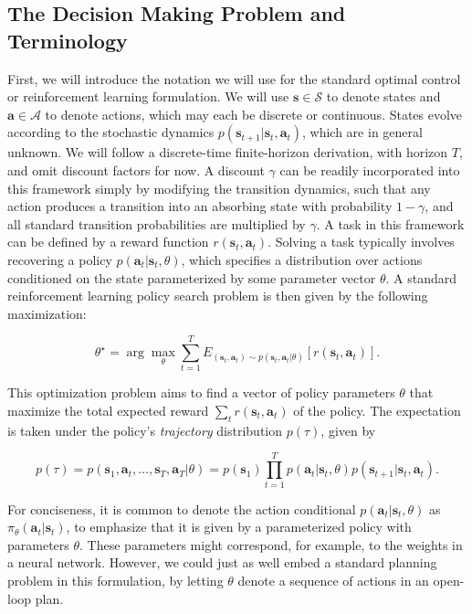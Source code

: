 \subsection{The Decision Making Problem and Terminology}

First, we will introduce the notation we will use for the standard optimal control or reinforcement learning formulation. We will use $\mathbf{s} \in \mathcal{S}$ to denote states and $\mathbf{a} \in \mathcal{A}$ to denote actions, which may each be discrete or continuous. States evolve according to the stochastic dynamics $p(\mathbf{s}_{t+1}|\mathbf{s}_t,\mathbf{a}_t)$, which are in general unknown. We will follow a discrete-time finite-horizon derivation, with horizon $T$, and omit discount factors for now. A discount $\gamma$ can be readily incorporated into this framework simply by modifying the transition dynamics, such that any action produces a transition into an absorbing state with probability $1-\gamma$, and all standard transition probabilities are multiplied by $\gamma$. A task in this framework can be defined by a reward function $r(\mathbf{s}_t,\mathbf{a}_t)$. Solving a task typically involves recovering a policy $p(\mathbf{a}_t|\mathbf{s}_t, \theta)$, which specifies a distribution over actions conditioned on the state parameterized by some parameter vector $\theta$. A standard reinforcement learning policy search problem is then given by the following maximization:

\begin{equation}
\theta^\star = \arg\max_\theta \sum_{t=1}^T E_{(\mathbf{s}_t,\mathbf{a}_t) \sim p(\mathbf{s}_t,\mathbf{a}_t|\theta)}[r(\mathbf{s}_t,\mathbf{a}_t)]. \label{eq:rl}
\end{equation}

This optimization problem aims to find a vector of policy parameters $\theta$ that maximize the total expected reward $\sum_t r(\mathbf{s}_t,\mathbf{a}_t)$ of the policy. The expectation is taken under the policy's \emph{trajectory} distribution $p(\tau)$, given by

\begin{equation}
p(\tau) = p(\mathbf{s}_1,\mathbf{a}_t,\dots,\mathbf{s}_T,\mathbf{a}_T|\theta) = p(\mathbf{s}_1)\prod_{t=1}^T p(\mathbf{a}_t|\mathbf{s}_t, \theta) p(\mathbf{s}_{t+1}|\mathbf{s}_t,\mathbf{a}_t).
\end{equation}

For conciseness, it is common to denote the action conditional $p(\mathbf{a}_t|\mathbf{s}_t, \theta)$ as $\pi_\theta(\mathbf{a}_t|\mathbf{s}_t)$, to emphasize that it is given by a parameterized policy with parameters $\theta$. These parameters might correspond, for example, to the weights in a neural network. However, we could just as well embed a standard planning problem in this formulation, by letting $\theta$ denote a sequence of actions in an open-loop plan.

